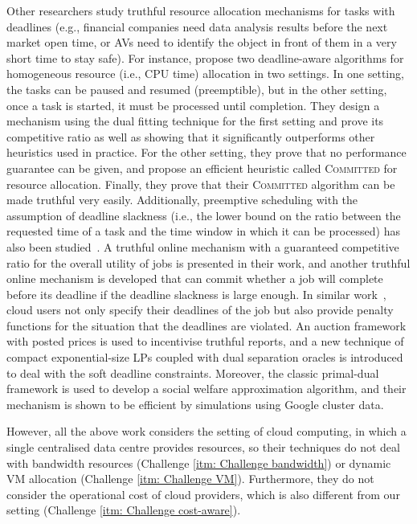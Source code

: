 \documentclass[11pt]{phdthesis}
\begin{document}
Other researchers study truthful resource allocation mechanisms for tasks with deadlines (e.g., financial companies need data analysis results before the next market open time, or AVs need to identify the object in front of them in a very short time to stay safe). For instance, \citet{lucier2013efficient} propose two deadline-aware algorithms for homogeneous resource (i.e., CPU time) allocation in two settings. In one setting, the tasks can be paused and resumed (preemptible), but in the other setting, once a task is started, it must be processed until completion. They design a mechanism using the dual fitting technique for the first setting and prove its competitive ratio as well as showing that it significantly outperforms other heuristics used in practice. For the other setting, they prove that no performance guarantee can be given, and propose an efficient heuristic called \textsc{Committed} for resource allocation. Finally, they prove that their \textsc{Committed} algorithm can be made truthful very easily.
Additionally, preemptive scheduling with the assumption of deadline slackness (i.e., the lower bound on the ratio between the requested time of a task and the time window in which it can be processed) has also been studied~\citep{azar2015truthful}. A truthful online mechanism with a guaranteed competitive ratio for the overall utility of jobs is presented in their work, and another truthful online mechanism is developed that can commit whether a job will complete before its deadline if the deadline slackness is large enough. In similar work~\citep{zhou2017efficient}, cloud users not only specify their deadlines of the job but also provide penalty functions for the situation that the deadlines are violated. An auction framework with posted prices is used to incentivise truthful reports, and a new technique of compact exponential-size LPs coupled with dual separation oracles is introduced to deal with the soft deadline constraints. Moreover, the classic primal-dual framework is used to develop a social welfare approximation algorithm, and their mechanism is shown to be efficient by simulations using Google cluster data. 

However, all the above work considers the setting of cloud computing, in which a single centralised data centre provides resources, so their techniques do not deal with bandwidth resources (Challenge \ref{itm: Challenge bandwidth}) or dynamic VM allocation (Challenge \ref{itm: Challenge VM}). Furthermore, they do not consider the operational cost of cloud providers, which is also different from our setting (Challenge \ref{itm: Challenge cost-aware}). 
\end{document}
